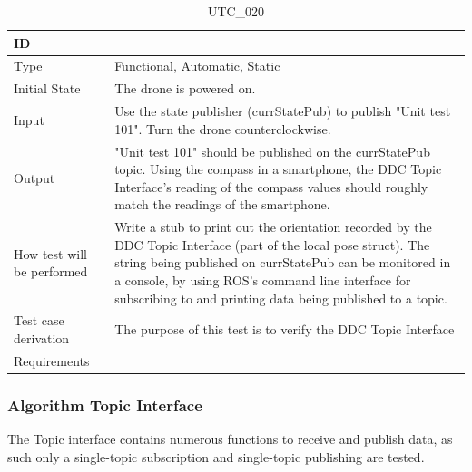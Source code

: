 \documentclass[12pt, titlepage]{article}
\begin{document}
\begin{table}[!h]
\begin{center}
\caption {UTC\_020}
\label{tab:UTC_020}
\begin{tabular}{ | m{3.2cm} | m{12.2cm} | } 
\hline
ID & \nameref{tab:UTC_020} \\ 
\hline
Type &  Functional, Automatic, Static  \\ 
\hline
Initial State & The drone is powered on. \\ 
\hline
Input & Use the state publisher (currStatePub) to publish "Unit test 101". Turn the drone counterclockwise. \\ 
\hline
Output &  "Unit test 101" should be published on the currStatePub topic. Using the compass in a smartphone, the DDC Topic Interface's reading of the compass values should roughly match the readings of the smartphone. \\ 
\hline
How test will be performed & Write a stub to print out the orientation recorded by the DDC Topic Interface (part of the local pose struct). The string being published on currStatePub can be monitored in a console, by using ROS's command line interface for subscribing to and printing data being published to a topic. \\ 
\hline
Test case derivation & The purpose of this test is to verify the DDC Topic Interface \\ 
\hline
Requirements &  \\ 
\hline
\end{tabular}
\end{center}
\end{table}

\subsubsection{Algorithm Topic Interface}

The Topic interface contains numerous functions to receive and publish data, as such only a single-topic subscription and single-topic publishing are tested.
\end{document}
